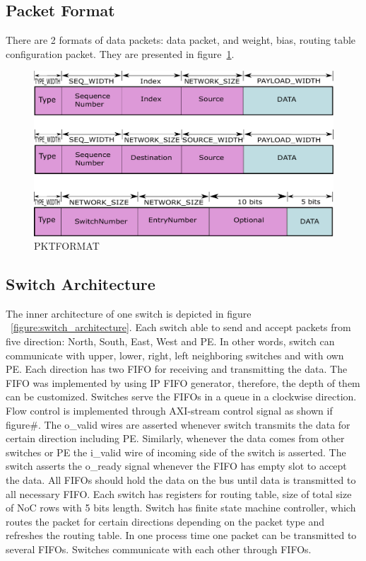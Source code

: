 \subsection{Packet Format}
There are 2 formats of data packets: data packet, and weight, bias, routing table  configuration packet. They are presented in figure~\ref{figure:pktformat}.  

\begin{figure}
    \includegraphics[width=\textwidth]{Figures/pktformat.pdf}
    \caption{PKTFORMAT} 
    \label{figure:pktformat}
\end{figure}

\subsection{Switch Architecture}
The inner architecture of one switch is depicted in figure ~\ref{figure:switch_architecture}. Each switch able to send and accept packets from five direction: North, South, East, West and PE. In other words, switch can communicate with upper, lower, right, left neighboring switches and with own PE. Each direction has two FIFO for receiving and transmitting the data. The FIFO was implemented by using IP FIFO generator, therefore, the depth of them can be customized. Switches serve the FIFOs in a queue in a clockwise direction.  Flow control is implemented through AXI-stream control signal as shown if figure#.  The o_valid wires are asserted whenever switch transmits the data for certain direction including PE. Similarly, whenever the data comes from other switches or PE the i_valid wire of incoming side of the switch is asserted. The switch asserts the o_ready signal whenever the FIFO has empty slot to accept the data. All FIFOs should hold the data on the bus until data is transmitted to all necessary FIFO. Each switch has registers for routing table, size of total size of NoC rows with 5 bits length. Switch has finite state machine controller, which routes the packet for certain directions depending on the packet type and refreshes the routing table. In one process time one packet can be transmitted to several FIFOs. Switches communicate with each other through FIFOs.  

